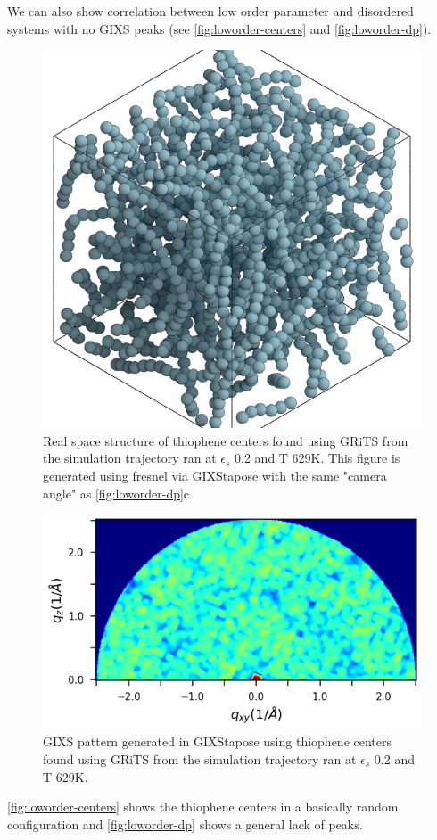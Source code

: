 We can also show correlation between low order parameter and disordered systems with no GIXS peaks (see \autoref{fig:loworder-centers} and \autoref{fig:loworder-dp}).
\begin{figure}
    \centering
    \includegraphics[width=0.8\linewidth]{figures/p3ht_val/cg-trajectory-amorphous_scene.png}
    \caption{Real space structure of thiophene centers found using GRiTS from the simulation trajectory ran at $\epsilon_{s}$ 0.2 and T 629K. This figure is generated using fresnel via GIXStapose with the same "camera angle" as \autoref{fig:loworder-dp}c}\label{fig:loworder-centers}
\end{figure}
\begin{figure}
    \centering
    \includegraphics[width=0.8\linewidth]{figures/opa_notebook/Order_parameter_analysis_21_0.png}
    \caption{GIXS pattern generated in GIXStapose using thiophene centers found using GRiTS from the simulation trajectory ran at $\epsilon_{s}$ 0.2 and T 629K.}\label{fig:loworder-dp}
\end{figure}
\autoref{fig:loworder-centers} shows the thiophene centers in a basically random configuration and \autoref{fig:loworder-dp} shows a general lack of peaks.


